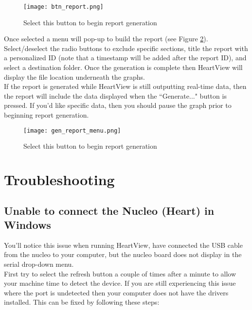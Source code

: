 \documentclass[11pt,fleqn]{book} %
\begin{document}
\begin{figure}[h]
	\centering\texttt{[image: btn\_report.png]}
	\caption{Select this button to begin report generation}
	\label{fig:gen_report_icon} %
\end{figure}

Once selected a menu will pop-up to build the report (see Figure \ref{fig:gen_report_menu}). Select/deselect the radio buttons to exclude specific sections, title the report with a personalized ID (note that a timestamp will be added after the report ID), and select a destination folder. Once the generation is complete then HeartView will display the file location underneath the graphs.\\ 

If the report is generated while HeartView is still outputting real-time data, then the report will include the data displayed when the ``Generate..." button is pressed. If you'd like specific data, then you should pause the graph prior to beginning report generation. 

\begin{figure}[h]
	\centering\texttt{[image: gen\_report\_menu.png]}
	\caption{Select this button to begin report generation}
	\label{fig:gen_report_menu} %
\end{figure}


\section{Troubleshooting}

\subsection{Unable to connect the Nucleo (Heart) in Windows}

You'll notice this issue when running HeartView, have connected the USB cable from the nucleo to your computer, but the nucleo board does not display in the serial drop-down menu.\\

First try to select the refresh button a couple of times after a minute to allow your machine time to detect the device. If you are still experiencing this issue where the port is undetected then your computer does not have the drivers installed. This can be fixed by following these steps:\\
\end{document}
